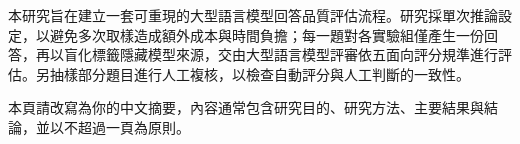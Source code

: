 \begin{chineseabstract}
本研究旨在建立一套可重現的大型語言模型回答品質評估流程。研究採單次推論設定，以避免多次取樣造成額外成本與時間負擔；每一題對各實驗組僅產生一份回答，再以盲化標籤隱藏模型來源，交由大型語言模型評審依五面向評分規準進行評估。另抽樣部分題目進行人工複核，以檢查自動評分與人工判斷的一致性。

本頁請改寫為你的中文摘要，內容通常包含研究目的、研究方法、主要結果與結論，並以不超過一頁為原則。

\zhkeywordsfrommetadata
\end{chineseabstract}
